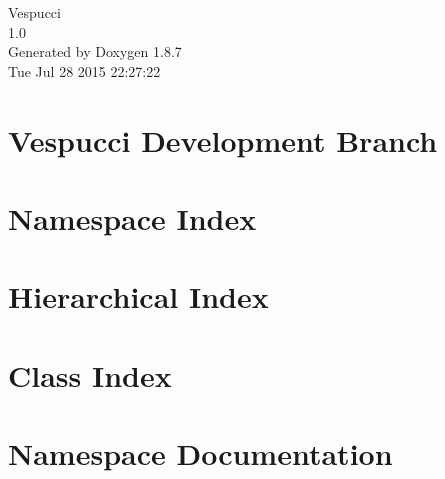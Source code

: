\documentclass[twoside]{book}
\newcommand{\+}{\discretionary{\mbox{\scriptsize$\hookleftarrow$}}{}{}}
\newcommand{\clearemptydoublepage}{%
  \newpage{\pagestyle{empty}\cleardoublepage}%
}
\begin{document}
\hypersetup{pageanchor=false,
             bookmarks=true,
             bookmarksnumbered=true,
             pdfencoding=unicode
            }
\begin{titlepage}
\vspace*{7cm}
\begin{center}%
{\Large Vespucci \\[1ex]\large 1.\+0 }\\
\vspace*{1cm}
{\large Generated by Doxygen 1.8.7}\\
\vspace*{0.5cm}
{\small Tue Jul 28 2015 22:27:22}\\
\end{center}
\end{titlepage}
\clearemptydoublepage
\tableofcontents
\clearemptydoublepage
{}
\hypersetup{pageanchor=true}

\chapter{Vespucci Development Branch}
\label{md__c_1__projects__vespucci_develop__r_e_a_d_m_e}
\hypertarget{md__c_1__projects__vespucci_develop__r_e_a_d_m_e}{}

\chapter{Namespace Index}

\chapter{Hierarchical Index}

\chapter{Class Index}

\chapter{Namespace Documentation}








\end{document}

